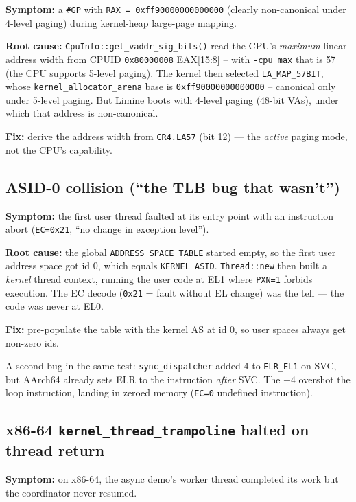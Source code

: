 \textbf{Symptom:} a \texttt{\#GP} with \texttt{RAX = 0xff90000000000000}
(clearly non-canonical under 4-level paging) during kernel-heap large-page
mapping.

\textbf{Root cause:} \texttt{CpuInfo::get\_vaddr\_sig\_bits()} read the CPU's
\emph{maximum} linear address width from CPUID \texttt{0x80000008}
EAX[15:8] -- with \texttt{-cpu max} that is 57 (the CPU supports 5-level
paging). The kernel then selected \texttt{LA\_MAP\_57BIT}, whose
\texttt{kernel\_allocator\_arena} base is \texttt{0xff90000000000000} --
canonical only under 5-level paging. But Limine boots with 4-level paging
(48-bit VAs), under which that address is non-canonical.

\textbf{Fix:} derive the address width from \texttt{CR4.LA57} (bit 12) ---
the \emph{active} paging mode, not the CPU's capability.

\subsection{ASID-0 collision (``the TLB bug that wasn't'')}

\textbf{Symptom:} the first user thread faulted at its entry point with
an instruction abort (\texttt{EC=0x21}, ``no change in exception level'').

\textbf{Root cause:} the global \texttt{ADDRESS\_SPACE\_TABLE} started empty,
so the first user address space got id 0, which equals \texttt{KERNEL\_ASID}.
\texttt{Thread::new} then built a \emph{kernel} thread context, running the
user code at EL1 where \texttt{PXN=1} forbids execution. The EC decode
(\texttt{0x21} = fault without EL change) was the tell --- the code was
never at EL0.

\textbf{Fix:} pre-populate the table with the kernel AS at id 0, so user
spaces always get non-zero ids.

A second bug in the same test: \texttt{sync\_dispatcher} added 4 to
\texttt{ELR\_EL1} on SVC, but AArch64 already sets ELR to the instruction
\emph{after} SVC. The +4 overshot the loop instruction, landing in zeroed
memory (\texttt{EC=0} undefined instruction).

\subsection{x86-64 \texttt{kernel\_thread\_trampoline} halted on thread return}

\textbf{Symptom:} on x86-64, the async demo's worker thread completed its
work but the coordinator never resumed.

